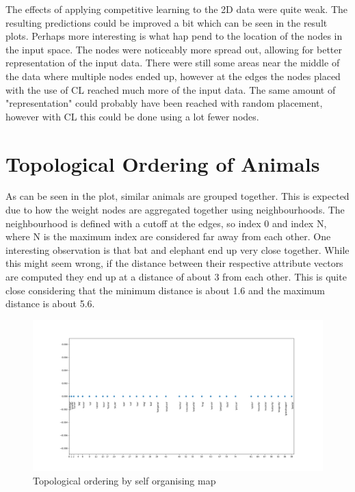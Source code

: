 \documentclass{article}
\begin{document}
The effects of applying competitive learning to the 2D data were quite weak. The resulting predictions could be improved a bit which can be seen in the result plots. Perhaps more interesting is what hap pend to the location of the nodes in the input space. The nodes were noticeably more spread out, allowing for better representation of the input data. There were still some areas near the middle of the data where multiple nodes ended up, however at the edges the nodes placed with the use of CL reached much more of the input data. The same amount of "representation" could probably have been reached with random placement, however with CL this could be done using a lot fewer nodes.

\FloatBarrier
\section{Topological Ordering of Animals}
As can be seen in the plot, similar animals are grouped together. This is expected due to how the weight nodes are aggregated together using neighbourhoods. The neighbourhood is defined with a cutoff at the edges, so index 0 and index N, where N is the maximum index are considered far away from each other. One interesting observation is that bat and elephant end up very close together. While this might seem wrong, if the distance between their respective attribute vectors are computed they end up at a distance of about 3 from each other. This is quite close considering that the minimum distance is about 1.6 and the maximum distance is about 5.6.

\begin{figure}[ht!]
  \centering
  \includegraphics[width=1\linewidth]{plots/assignment_2/animal_order.png}
  \caption{Topological ordering by self organising map}
\end{figure}
\end{document}
